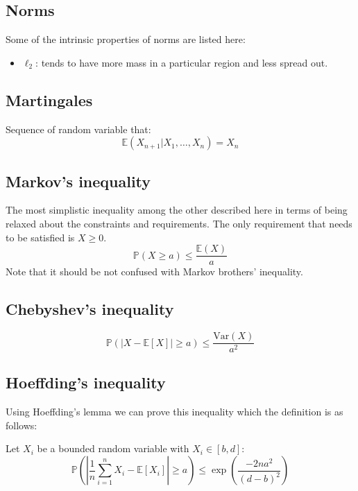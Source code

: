 \documentclass[a4paper,12pt]{article}
\begin{document}
\subsection{Norms}
Some of the intrinsic properties of norms are listed here:
\begin{itemize}
    \item $\ell_2$: tends to have more mass in a particular region and less spread out. 
\end{itemize}

\subsection{Martingales}
Sequence of random variable that:
\begin{equation}
    \mathbb { E } \left( X _ { n + 1 } | X _ { 1 } , \ldots , X _ { n } \right) = X _ { n }
\end{equation}

\subsection{Markov's inequality}
The most simplistic inequality among the other described here in terms of being relaxed about the constraints and requirements. The only requirement that needs to be satisfied is $X \geq 0$.
\begin{equation}
\mathbb {P}(X \geq a ) \leq \frac { \mathbb { E}( X ) } { a }
\end{equation}
Note that it should be not confused with Markov brothers' inequality.

\subsection{Chebyshev's inequality}
\begin{equation}
\mathbb {P}(|X - \mathbb{E}[X]| \geq a ) \leq \frac { \mathrm { Var}( X ) } { a^2 }
\end{equation}


\subsection{Hoeffding's inequality}
Using Hoeffding's lemma we can prove this inequality which the definition is as follows:

Let $X_i$ be a bounded random variable with $X_i \in [b, d]$:
\begin{equation}
    \mathbb {P} \left( \left| \frac{1}{n} \sum_{i=1}^{n} X_i - \mathbb{E}[X_i] \right| \geq a \right) \leq { \exp \left( \frac{-2 n a ^ {2} }{ \left(d-b \right) ^ 2} \right) }
\end{equation}
\end{document}
